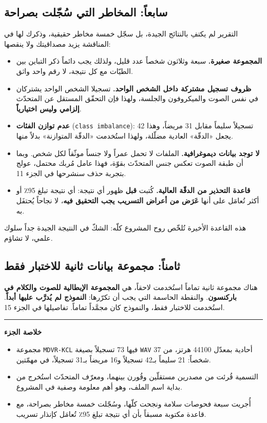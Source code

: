 \documentclass[12pt,a4paper]{report}
\newcommand{\E}[1]{\textenglish{\texttt{#1}}}
\newcommand{\N}[1]{\textenglish{#1}}
\newcommand{\qism}[1]{\subsection*{#1}}
\newcommand{\masdar}[1]{\par\vspace{2pt}{\small\textit{المصدر: #1}}\par}
\newcommand{\khulasa}{\par\vspace{4pt}\hrule\vspace{6pt}\textbf{خلاصة الجزء}\par}
\begin{document}
\qism{سابعاً: المخاطر التي سُجّلت بصراحة}

التقرير لم يكتفِ بالنتائج الجيدة، بل سجّل خمسة مخاطر حقيقية، وذكرك لها في
المناقشة يزيد مصداقيتك ولا ينقصها:

\begin{itemize}
  \item \textbf{المجموعة صغيرة.} سبعة وثلاثون شخصاً عدد قليل، ولذلك يجب دائماً
        ذكر التباين بين الطيّات مع كل نتيجة، لا رقم واحد واثق.
  \item \textbf{ظروف تسجيل مشتركة داخل الشخص الواحد.} تسجيلا الشخص الواحد
        يشتركان في نفس الصوت والميكروفون والجلسة، ولهذا فإن التحقّق المستقل عن
        المتحدّث \textbf{إلزامي وليس اختيارياً}.
  \item \textbf{عدم توازن الفئات} (\E{class imbalance}): \N{42} تسجيلاً سليماً
        مقابل \N{31} مريضاً، وهذا يجعل «الدقّة» العادية مضلّلة، ولهذا استُخدمت
        «الدقّة المتوازنة» بدلاً منها.
  \item \textbf{لا توجد بيانات ديموغرافية.} الملفات لا تحمل عمراً ولا جنساً
        موثّقاً لكل شخص. وبما أن طبقة الصوت تعكس جنس المتحدّث بقوّة، فهذا عامل
        مُربك محتمل، عولج بتجربة حذف سنشرحها في الجزء \N{11}.
  \item \textbf{قاعدة التحذير من الدقّة العالية.} كُتبت \textbf{قبل} ظهور أي
        نتيجة: أي نتيجة تبلغ \N{95}٪ أو أكثر تُعامَل على أنها \textbf{عَرَض من
        أعراض التسريب يجب التحقيق فيه}، لا نجاحاً يُحتفَل به.
\end{itemize}
\masdar{\E{docs/03\_dataset.md} القسم \N{3.7}}

هذه القاعدة الأخيرة تُلخّص روح المشروع كلّه: الشكّ في النتيجة الجيدة جداً سلوك
علمي، لا تشاؤم.

\qism{ثامناً: مجموعة بيانات ثانية للاختبار فقط}

هناك مجموعة ثانية تماماً استُخدمت لاحقاً، هي \textbf{المجموعة الإيطالية للصوت
والكلام في باركنسون}. والنقطة الحاسمة التي يجب أن تكرّرها: \textbf{النموذج لم
يُدرَّب عليها أبداً}. استُخدمت للاختبار فقط، والنموذج كان مجمَّداً تماماً.
تفاصيلها في الجزء \N{15}.

\khulasa
\begin{itemize}
  \item مجموعة \E{MDVR-KCL} فيها \N{73} تسجيلاً بصيغة \E{WAV} أحادية بمعدّل
        \N{44100} هرتز، من \N{37} شخصاً: \N{21} سليماً بـ\N{42} تسجيلاً و\N{16}
        مريضاً بـ\N{31} تسجيلاً، في مهمّتين.
  \item التسمية قُرئت من مصدرين مستقلّين وقُورن بينهما، ومعرّف المتحدّث استُخرج
        من بداية اسم الملف، وهو أهم معلومة وصفية في المشروع.
  \item أُجريت سبعة فحوصات سلامة ونجحت كلّها، وسُجّلت خمسة مخاطر بصراحة، مع قاعدة
        مكتوبة مسبقاً بأن أي نتيجة تبلغ \N{95}٪ تُعامَل كإنذار تسريب.
\end{itemize}
\end{document}
